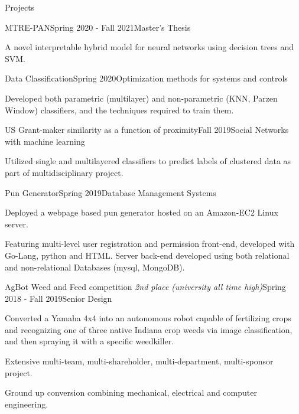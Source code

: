 \documentclass{resume}
\begin{document}
% 
% 
\begin{rSection}{Projects}

\begin{rSubsection}{MTRE-PAN}{Spring 2020 - Fall 2021}{{Master's Thesis}}{}
    \item A novel interpretable hybrid model for neural networks using decision trees and SVM.
\end{rSubsection}


\begin{rSubsection}{Data Classification}{Spring 2020}{{Optimization methods for systems and controls}}{}
    \item Developed both parametric (multilayer) and non-parametric (KNN, Parzen Window) classifiers, and the techniques required to train them.
\end{rSubsection}

\begin{rSubsection}{US Grant-maker similarity as a function of proximity}{Fall 2019}{{Social Networks with machine learning}}{}
    \item Utilized single and multilayered classifiers to predict labels of clustered data as part of multidisciplinary project.
\end{rSubsection}

\begin{rSubsection}{Pun Generator}{Spring 2019}{{Database Management Systems}}{}
    \item Deployed a webpage based pun generator hosted on an Amazon-EC2 Linux server.
    \item Featuring multi-level user registration and permission front-end, developed with Go-Lang, python and HTML. Server back-end developed using both relational and non-relational Databases (mysql, MongoDB).
\end{rSubsection}

\begin{rSubsection}{AgBot Weed and Feed competition \emph{2nd place (university all time high)}}{Spring 2018 - Fall 2019}{{Senior Design}}{}
    \item Converted a Yamaha 4x4 into an autonomous robot capable of fertilizing crops and recognizing one of three native Indiana crop weeds via image classification, and then spraying it with a specific weedkiller.
    \item Extensive multi-team, multi-shareholder, multi-department, multi-sponsor project.
    \item Ground up conversion combining mechanical, electrical and computer engineering.
\end{rSubsection}


\end{rSection}
\end{document}
